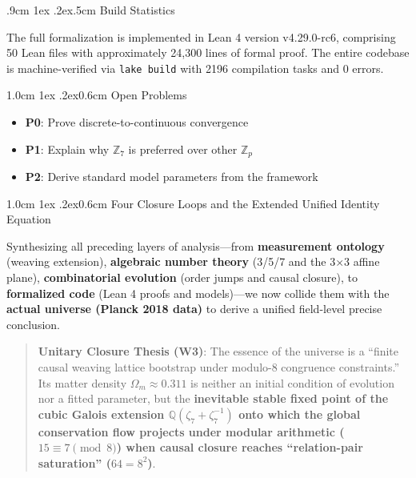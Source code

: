 \documentclass[aps,prd,twocolumn,nofootinbib,floatfix]{revtex4-2}
\makeatletter
\def\section{%
  \@startsection{section}{1}{\z@}
    {1.0cm \@plus1ex \@minus .2ex}{0.6cm}
    {\normalfont\large\bfseries\centering}%
}
\def\subsection{%
  \@startsection{subsection}{2}{\z@}
    {.9cm \@plus1ex \@minus .2ex}{.5cm}
    {\normalfont\normalsize\bfseries\centering}%
}
\makeatother
\begin{document}
\subsection{Build Statistics}

The full formalization is implemented in Lean 4 version v4.29.0-rc6, comprising 50 Lean files with approximately 24,300 lines of formal proof. The entire codebase is machine-verified via \texttt{lake build} with 2196 compilation tasks and 0 errors.

\section{Open Problems}

\begin{itemize}
    \item \textbf{P0}: Prove discrete-to-continuous convergence
    \item \textbf{P1}: Explain why $\mathbb{Z}_7$ is preferred over other $\mathbb{Z}_p$
    \item \textbf{P2}: Derive standard model parameters from the framework
\end{itemize}

\section{Four Closure Loops and the Extended Unified Identity Equation}

Synthesizing all preceding layers of analysis---from \textbf{measurement ontology} (weaving extension), \textbf{algebraic number theory} (3/5/7 and the 3$\times$3 affine plane), \textbf{combinatorial evolution} (order jumps and causal closure), to \textbf{formalized code} (Lean 4 proofs and models)---we now collide them with the \textbf{actual universe (Planck 2018 data)} to derive a unified field-level precise conclusion.

\begin{quote}
\textbf{Unitary Closure Thesis (W3)}: The essence of the universe is a ``finite causal weaving lattice bootstrap under modulo-8 congruence constraints.'' Its matter density $\Omega_m \approx 0.311$ is neither an initial condition of evolution nor a fitted parameter, but the \textbf{inevitable stable fixed point of the cubic Galois extension $\mathbb{Q}(\zeta_7+\zeta_7^{-1})$ onto which the global conservation flow projects under modular arithmetic ($15 \equiv 7 \pmod 8$) when causal closure reaches ``relation-pair saturation'' ($64 = 8^2$)}.
\end{quote}
\end{document}
